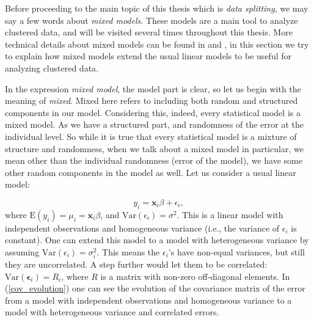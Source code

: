 \documentclass[11pt,a5paper,twoside]{book}
\begin{document}
Before proceeding to the main topic of this thesis which is \emph{data splitting}, we may say a few words about \emph{mixed models}. These models are a main tool to analyze clustered data, and will be visited several times throughout this thesis. More technical details about mixed models can be found in \cite{Molenberghs2000} and \cite{molenberghs2005}, in this section we try to explain how mixed models extend the usual linear models to be useful for analyzing clustered data. 

In the expression \emph{mixed model}, the model part is clear, so let us begin with the meaning of \emph{mixed}. Mixed here refers to including both random and structured components in our model. Considering this, indeed, every statistical model is a mixed model. As we have a structured part, and randomness of the error at the individual level. So while it is true that every statistical model is a mixture of structure and randomness, when we talk about a mixed model in particular, we mean other than the individual randomness (error of the model), we have some other random components in the model as well. Let us consider a usual linear model: 

\begin{equation}
\label{lin_model}
y_i = \mathbf{x}_i\beta + \epsilon_i,
\end{equation}
where $\mathrm{E}(y_i) = \mu_i = \mathbf{x}_i \beta$, and $\mathrm{Var}(\epsilon_i) = \sigma^2$. This is a linear model with independent observations and homogeneous variance (i.e., the variance of $\epsilon_i$ is constant). One can extend this model to a model with heterogeneous variance by assuming $\mathrm{Var}(\epsilon_i) = \sigma^2_i$. This means the $\epsilon_i$'s have non-equal variances, but still they are uncorrelated. A step further would let them to be correlated: $\mathrm{Var}(\mathbf{\epsilon}_i) = R_i$, where $R$ is a matrix with non-zero off-diagonal elements. In (\ref{cov_evolution}) one can see the evolution of the covariance matrix of the error from a model with independent observations and homogeneous variance to a model with heterogeneous variance and correlated errors.
\end{document}

